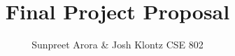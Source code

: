 \documentclass[12pt]{article}
\begin{document}
 
\title{Final Project Proposal}
\author{Sunpreet Arora \& Josh Klontz
CSE 802}
 
\maketitle
\end{document}
